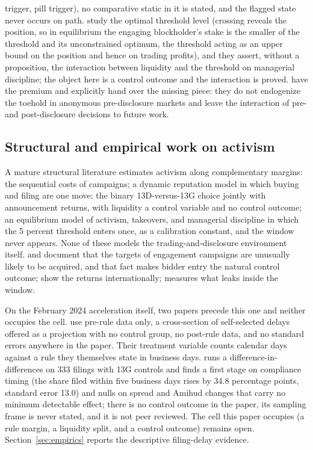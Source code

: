 \documentclass[11pt]{article}
\begin{document}
trigger, pill trigger), no comparative static in it is stated, and the flagged state never occurs on
path. \citet{OrdonezCalafiBernhardt2022} study the optimal threshold level (crossing reveals the
position, so in equilibrium the engaging blockholder's stake is the smaller of the threshold and its
unconstrained optimum, the threshold acting as an upper bound on the position and hence on trading
profits), and they assert, without
a proposition, the interaction between liquidity and the threshold on managerial discipline; the
object here is a control outcome and the interaction is proved. \citet{BurkartLee2022} have the
premium and explicitly hand over the missing piece: they do not endogenize the toehold in anonymous
pre-disclosure markets and leave the interaction of pre- and post-disclosure decisions to future
work.

\subsection{Structural and empirical work on activism}
\label{sec:lit-structural}

A mature structural literature estimates activism along complementary margins:
\citet{Gantchev2013} the sequential costs of campaigns; \citet{JohnsonSwem2021} a dynamic reputation
model in which buying and filing are one move; \citet{AlbuquerqueFosSchroth2022} the binary
13D-versus-13G choice jointly with announcement returns, with liquidity a control variable and no
control outcome; \citet{CelentanoLevine2025} an equilibrium model of activism, takeovers, and
managerial discipline in which the 5 percent threshold enters once, as a calibration constant, and
the window never appears. None of these models the trading-and-disclosure environment itself.
\citet{BravJiangPartnoyThomas2008} and \citet{GreenwoodSchor2009} document that the targets of engagement campaigns
are unusually likely to be acquired, and that fact makes bidder entry the natural control
outcome; \citet{BechtFranksGrantWagner2017} show the returns internationally; \citet{Zeng2026}
measures what leaks inside the window.

On the February 2024 acceleration itself, two papers precede this one and neither occupies the
cell. \citet{PolkBuchheitRileyStone2024} use pre-rule data only, a cross-section of self-selected
delays offered as a projection with no control group, no post-rule data, and no standard errors
anywhere in the paper. Their treatment variable counts calendar days against a rule they
themselves state in business days. \citet{Trivedi2026} runs a difference-in-differences on 333
filings with 13G controls and finds a first stage on compliance timing (the share filed within
five business days rises by 34.8 percentage points, standard error 13.0) and nulls on spread and
Amihud changes that carry no minimum detectable effect; there is no control outcome in the paper,
its sampling frame is never stated, and it is not peer reviewed. The cell this paper occupies (a rule margin, a liquidity split, and a control outcome) remains open.
Section~\ref{sec:empirics} reports the descriptive filing-delay evidence.
\end{document}
